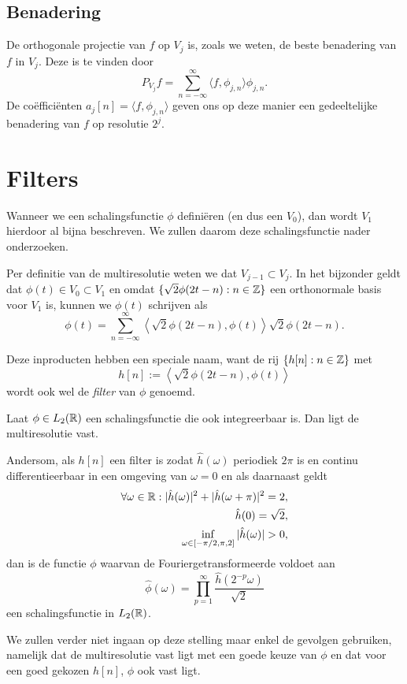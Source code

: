\subsection{Benadering} De orthogonale projectie van $f$ op $V_j$ is, zoals we weten, de beste benadering van $f$ in $V_j$. 
Deze is te vinden door
\[
P_{V_j} f = \sum_{n=-\infty}^\infty \langle f, \phi_{j,n} \rangle \phi_{j,n}.
\]
De co\"effici\"enten $a_j[n] = \langle f, \phi_{j,n} \rangle$ geven ons op deze manier een gedeeltelijke benadering 
van $f$ op resolutie $2^j$.

\section{Filters}
Wanneer we een schalingsfunctie $\phi$ defini\"eren (en dus een $V_0$), dan wordt $V_1$ hierdoor al bijna beschreven. 
We zullen daarom deze schalingsfunctie nader onderzoeken.

Per definitie van de multiresolutie weten we dat $V_{j-1} \subset V_j$. In het bijzonder geldt dat $\phi(t) \in V_0 \subset V_1$ en omdat $\{ \sqrt{2}\phi(2t - n): n \in \mathbb{Z}\}$ een orthonormale basis voor $V_1$ is, kunnen we $\phi(t)$ schrijven als
\begin{equation}
  \label{phi_t2}
  \phi(t) = \sum_{n=-\infty}^{\infty} \left\langle \sqrt{2} \phi\left(2t-n\right), \phi(t) \right\rangle 
  \sqrt{2}\phi(2t-n).
\end{equation}

\begin{definitie}
  Deze inproducten hebben een speciale naam, want de rij $\{h[n]: n \in \mathbb{Z}\}$ met
  \[
  h[n] := \left\langle \sqrt{2} \phi\left(2t-n\right), \phi(t) \right\rangle
  \]
  wordt ook wel de \emph{filter} van $\phi$ genoemd.
\end{definitie}
\begin{stelling}
  \label{filter}
  Laat $\phi \in L_2(\mathbb{R})$ een schalingsfunctie die ook integreerbaar is. Dan ligt de multiresolutie vast.

  Andersom, als $h[n]$ een filter is zodat $\hat{h}(\omega)$ periodiek $2\pi$ is en continu differentieerbaar in een omgeving van $\omega = 0$ en als daarnaast geldt
  \begin{align*}
    \forall \omega \in \mathbb{R}: | \hat{h}(\omega)|^2 + |\hat{h}(\omega + \pi)|^2 = 2, \\
    \hat{h}(0) = \sqrt{2}, \\
    \inf_{\omega \in [-\pi/2, \pi,2]} |\hat{h}(\omega)| > 0,
  \end{align*}
  dan is de functie $\phi$ waarvan de Fouriergetransformeerde voldoet aan
  \[
  \hat{\phi}(\omega) = \prod_{p=1}^\infty \frac{\hat{h}(2^{-p}\omega)}{\sqrt{2}}
  \]
  een schalingsfunctie in $L_2(\mathbb{R})$.
\end{stelling}
We zullen verder niet ingaan op deze stelling maar enkel de gevolgen gebruiken, namelijk dat de multiresolutie vast ligt met een goede keuze van $\phi$ en dat voor een goed gekozen $h[n]$, $\phi$ ook vast ligt.

